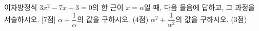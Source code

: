 이차방정식 $3x^2-7x+3=0$의 한 근이 $x=\alpha$일 때, 다음 물음에 답하고, 그 과정을 서술하시오. \mbox{[7점]}
 $\alpha+\dfrac{1}{\alpha}$의 값을 구하시오. (4점)
 $\alpha^2+\dfrac{1}{\alpha^2}$의 값을 구하시오. (3점)
